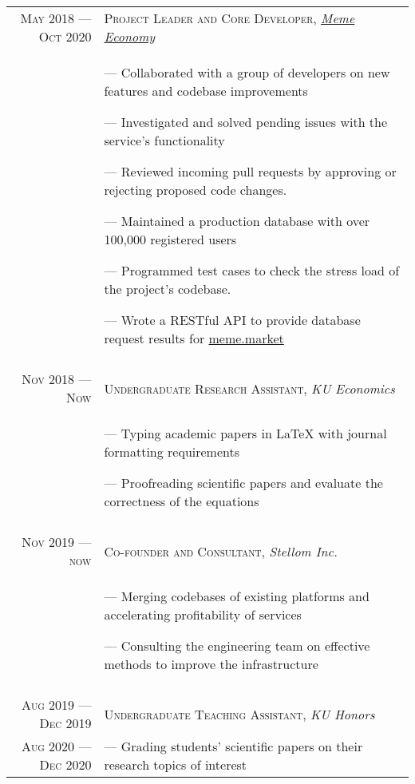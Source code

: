 \documentclass[a4paper, 10pt]{article}
\begin{document}
\begin{tabular}{r|p{12cm}}
	\textsc{May 2018 --- Oct 2020} & \textsc{Project Leader and Core Developer}, \emph{\href{https://meme.market}{Meme Economy}} \\&\footnotesize{
		--- Collaborated with a group of developers on new features and codebase improvements

		--- Investigated and solved pending issues with the service's functionality

		--- Reviewed incoming pull requests by approving or rejecting proposed code changes.

		--- Maintained a production database with over 100,000 registered users

		--- Programmed test cases to check the stress load of the project's codebase.

		--- Wrote a RESTful API to provide database request results for \href{https://meme.market}{meme.market}
	}                                                                                                                            \\\multicolumn{2}{c}{}\\

	\textsc{Nov 2018 --- Now}      & \textsc{Undergraduate Research Assistant}, \emph{KU Economics}                              \\&\footnotesize{
		--- Typing academic papers in \LaTeX{} with journal formatting requirements

		--- Proofreading scientific papers and evaluate the correctness of the equations
	}                                                                                                                            \\\multicolumn{2}{c}{}\\

	\textsc{Nov 2019 --- now}      & \textsc{Co-founder and Consultant}, \emph{Stellom Inc.}                                     \\&\footnotesize{
		--- Merging codebases of existing platforms and accelerating profitability of services

		--- Consulting the engineering team on effective methods to improve the infrastructure
	}                                                                                                                            \\\multicolumn{2}{c}{}\\

	\textsc{Aug 2019 --- Dec 2019} & \textsc{Undergraduate Teaching Assistant}, \emph{KU Honors}                                 \\ \textsc{Aug 2020 --- Dec 2020} &\footnotesize{
		--- Grading students' scientific papers on their research topics of interest

}
\end{tabular}
\end{document}

